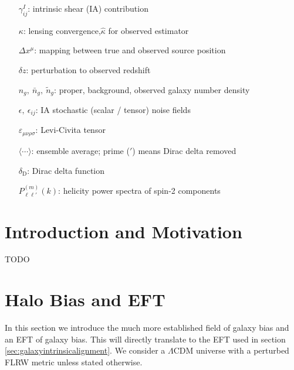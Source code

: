 \documentclass[11pt]{article}
\newcommand{\deltaD}{\delta_{\mathrm D}}
\begin{document}
\begin{itemize}
    \item[$\gamma^{I}_{ij}$:] intrinsic shear (IA) contribution
    \item[$\kappa$:] lensing convergence,\quad $\hat \kappa$ for observed estimator
    \item[$\Delta x^\mu$:] mapping between true and observed source position
    \item[$\delta z$:] perturbation to observed redshift
    \item[$n_g,\ \bar n_g,\ \tilde n_g$:] proper, background, observed galaxy number density
    \item[$\epsilon,\ \epsilon_{ij}$:] IA stochastic (scalar / tensor) noise fields
    \item[$\varepsilon_{\mu\nu\rho\sigma}$:] Levi-Civita tensor
    \item[$\langle\cdots\rangle$:] ensemble average; prime (${}'$) means Dirac delta removed
    \item[$\deltaD$:] Dirac delta function
    \item[$P^{(m)}_{\ell\ell'}(k)$:] helicity power spectra of spin-2 components
  \end{itemize}
  \normalsize
  

\section{Introduction and Motivation}
TODO

\section{Halo Bias and EFT}
In this section we introduce the much more established field of galaxy bias and an EFT of galaxy bias. This will directly translate to the EFT used in section \ref{sec:galaxyintrinsicalignment}. We consider a $\Lambda$CDM universe with a perturbed FLRW metric unless stated otherwise.
\end{document}
